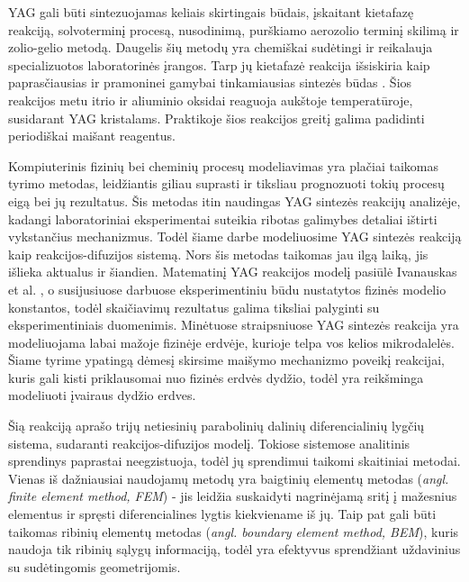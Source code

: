 \documentclass[]{VUMIFTemplateClass}
\begin{document}
YAG gali būti sintezuojamas keliais skirtingais būdais, įskaitant kietafazę reakciją, solvoterminį procesą, nusodinimą, purškiamo aerozolio terminį skilimą ir zolio-gelio metodą. Daugelis šių metodų yra chemiškai sudėtingi ir reikalauja specializuotos laboratorinės įrangos. Tarp jų kietafazė reakcija išsiskiria kaip paprasčiausias ir pramoninei gamybai tinkamiausias sintezės būdas \cite{zhangNovelSynthesisYAG2005}. Šios reakcijos metu itrio ir aliuminio oksidai reaguoja aukštoje temperatūroje, susidarant YAG kristalams. Praktikoje šios reakcijos greitį galima padidinti periodiškai maišant reagentus.

Kompiuterinis fizinių bei cheminių procesų modeliavimas yra plačiai taikomas tyrimo metodas, leidžiantis giliau suprasti ir tiksliau prognozuoti tokių procesų eigą bei jų rezultatus. Šis metodas itin naudingas YAG sintezės reakcijų analizėje, kadangi laboratoriniai eksperimentai suteikia ribotas galimybes detaliai ištirti vykstančius mechanizmus. Todėl šiame darbe modeliuosime YAG sintezės reakciją kaip reakcijos-difuzijos sistemą. Nors šis metodas taikomas jau ilgą laiką, jis išlieka aktualus ir šiandien. Matematinį YAG reakcijos modelį pasiūlė Ivanauskas et al. \cite{ivanauskasModellingSolidState2005}, o susijusiuose darbuose \cite{ivanauskasComputationalModellingYAG2009,mackeviciusCloserLookComputer2012} eksperimentiniu būdu nustatytos fizinės modelio konstantos, todėl skaičiavimų rezultatus galima tiksliai palyginti su eksperimentiniais duomenimis. Minėtuose straipsniuose YAG sintezės reakcija yra modeliuojama labai mažoje fizinėje erdvėje, kurioje telpa vos kelios mikrodalelės. Šiame tyrime ypatingą dėmesį skirsime maišymo mechanizmo poveikį reakcijai, kuris gali kisti priklausomai nuo fizinės erdvės dydžio, todėl yra reikšminga modeliuoti įvairaus dydžio erdves.

Šią reakciją aprašo trijų netiesinių parabolinių dalinių diferencialinių lygčių sistema, sudaranti reakcijos-difuzijos modelį. Tokiose sistemose analitinis sprendinys paprastai neegzistuoja, todėl jų sprendimui taikomi skaitiniai metodai. Vienas iš dažniausiai naudojamų metodų yra baigtinių elementų metodas (\textit{angl. finite element method, FEM}) - jis leidžia suskaidyti nagrinėjamą sritį į mažesnius elementus ir spręsti diferencialines lygtis kiekviename iš jų. Taip pat gali būti taikomas ribinių elementų metodas (\textit{angl. boundary element method, BEM}), kuris naudoja tik ribinių sąlygų informaciją, todėl yra efektyvus sprendžiant uždavinius su sudėtingomis geometrijomis.
\end{document}
